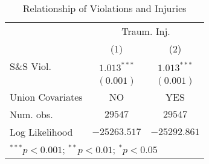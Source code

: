 
\begin{table}[H]
\begin{center}
\begin{tabular}{l c c}
\hline
 & \multicolumn{2}{c}{Traum. Inj.} \\
\cline{2-3}
 & (1) & (2) \\
\hline
S\&S Viol.       & $1.013^{***}$ & $1.013^{***}$ \\
                 & $(0.001)$     & $(0.001)$     \\
\hline
Union Covariates & NO            & YES           \\
Num. obs.        & $29547$       & $29547$       \\
Log Likelihood   & $-25263.517$  & $-25292.861$  \\
\hline
\multicolumn{3}{l}{\scriptsize{$^{***}p<0.001$; $^{**}p<0.01$; $^{*}p<0.05$}}
\end{tabular}
\caption{Relationship of Violations and Injuries}
\label{irr_traminj_ssviol}
\end{center}
\end{table}

